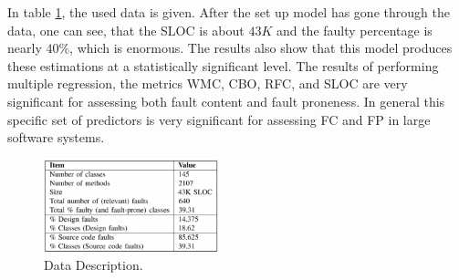 In table \ref{fig3bn}, the used data is given. After the set up model has gone through the data, one can see, that the SLOC is about $43K$ and the faulty percentage is nearly $40\%$, which is enormous. 
The results also show that this model produces these estimations at a statistically significant level. The results of performing multiple regression, the metrics WMC, CBO, RFC, and SLOC are very significant for assessing both fault content and fault proneness. In general this specific set of predictors is very significant for assessing FC and FP in large software systems.

\begin{figure}[htbp]
	\centerline{\includegraphics[width=0.45\textwidth]{pictures/tableBN.png}}
	\caption{Data Description.}
	\label{fig3bn}
\end{figure}

